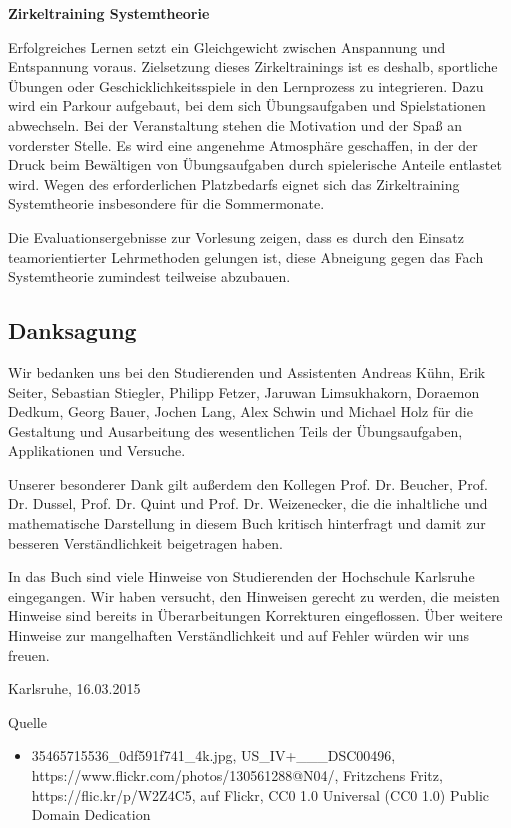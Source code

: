 {\selectfont
\noindent\textbf{Zirkeltraining Systemtheorie}} \smallskip

\noindent Erfolgreiches Lernen setzt ein Gleichgewicht zwischen Anspannung und Entspannung voraus. Zielsetzung dieses Zirkeltrainings ist es deshalb, sportliche \"{U}bungen oder Geschicklichkeitsspiele in den Lernprozess zu integrieren. Dazu wird ein Parkour aufgebaut, bei dem sich \"{U}bungsaufgaben und Spielstationen abwechseln. Bei der Veranstaltung stehen die Motivation und der Spa{\ss} an vorderster Stelle. Es wird eine angenehme Atmosph\"{a}re geschaffen, in der der Druck beim Bew\"{a}ltigen von \"{U}bungsaufgaben durch spielerische Anteile entlastet wird. Wegen des erforderlichen Platzbedarfs eignet sich das Zirkeltraining Systemtheorie insbesondere f\"{u}r die Sommermonate.

\noindent Die Evaluationsergebnisse zur Vorlesung zeigen, dass es durch den Einsatz teamorientierter Lehrmethoden gelungen ist, diese Abneigung gegen das Fach Systemtheorie zumindest teilweise abzubauen. 

\clearpage


\subsection{Danksagung}

\noindent Wir bedanken uns bei den Studierenden und Assistenten Andreas K\"{u}hn, Erik Seiter, Sebastian Stiegler, Philipp Fetzer, Jaruwan Limsukhakorn, Doraemon Dedkum, Georg Bauer, Jochen Lang, Alex Schwin und Michael Holz f\"{u}r die Gestaltung und Ausarbeitung des wesentlichen Teils der \"{U}bungsaufgaben, Applikationen und Versuche.

\noindent Unserer besonderer Dank gilt au{\ss}erdem den Kollegen Prof. Dr. Beucher, Prof. Dr. Dussel, Prof. Dr. Quint und Prof. Dr. Weizenecker, die die inhaltliche und mathematische Darstellung in diesem Buch kritisch hinterfragt und damit zur besseren Verst\"{a}ndlichkeit beigetragen haben. 

\noindent In das Buch sind viele Hinweise von Studierenden der Hochschule Karlsruhe eingegangen. Wir haben versucht, den Hinweisen gerecht zu werden, die meisten Hinweise sind bereits in \"{U}berarbeitungen Korrekturen eingeflossen. \"{U}ber weitere Hinweise zur mangelhaften Verst\"{a}ndlichkeit und auf Fehler w\"{u}rden wir uns freuen. \bigskip

\noindent Karlsruhe, 16.03.2015 \bigskip

\bigskip

\bigskip

\noindent Quelle 

\begin{itemize}
    \item 35465715536\_0df591f741\_4k.jpg,  US\_IV+\_\_\_DSC00496, https://www.flickr.com/photos/130561288@N04/, Fritzchens Fritz, https://flic.kr/p/W2Z4C5, auf Flickr, CC0 1.0 Universal (CC0 1.0) Public Domain Dedication 
\end{itemize}